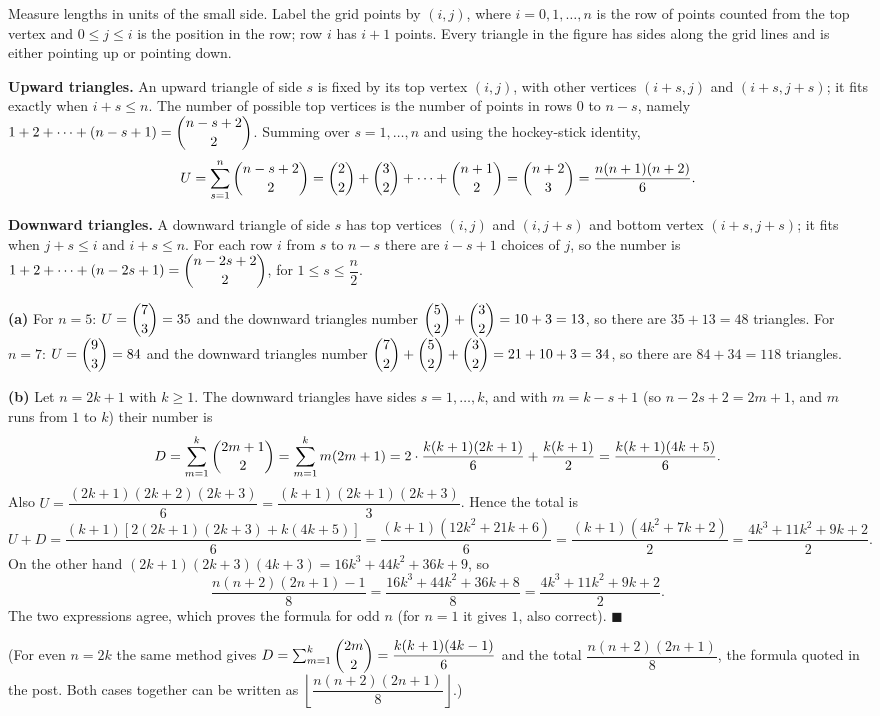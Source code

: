 Measure lengths in units of the small side. Label the grid points by $(i,j)$, where $i=0,1,\dots,n$ is the row of points counted from the top vertex and $0\le j\le i$ is the position in the row; row $i$ has $i+1$ points. Every triangle in the figure has sides along the grid lines and is either pointing up or pointing down.

\textbf{Upward triangles.} An upward triangle of side $s$ is fixed by its top vertex $(i,j)$, with other vertices $(i+s,j)$ and $(i+s,j+s)$; it fits exactly when $i+s\le n$. The number of possible top vertices is the number of points in rows $0$ to $n-s$, namely $1+2+\cdots+(n-s+1)=\dbinom{n-s+2}{2}$. Summing over $s=1,\dots,n$ and using the hockey-stick identity,
\[
U=\sum_{s=1}^{n}\dbinom{n-s+2}{2}=\dbinom22+\dbinom32+\cdots+\dbinom{n+1}{2}=\dbinom{n+2}{3}=\dfrac{n(n+1)(n+2)}{6}.
\]

\textbf{Downward triangles.} A downward triangle of side $s$ has top vertices $(i,j)$ and $(i,j+s)$ and bottom vertex $(i+s,j+s)$; it fits when $j+s\le i$ and $i+s\le n$. For each row $i$ from $s$ to $n-s$ there are $i-s+1$ choices of $j$, so the number is $1+2+\cdots+(n-2s+1)=\dbinom{n-2s+2}{2}$, for $1\le s\le\dfrac {n}{2}$.

\textbf{(a)} For $n=5$: $U=\dbinom73=35$ and the downward triangles number $\dbinom52+\dbinom32=10+3=13$, so there are $35+13=\boxed{48}$ triangles. For $n=7$: $U=\dbinom93=84$ and the downward triangles number $\dbinom72+\dbinom52+\dbinom32=21+10+3=34$, so there are $84+34=\boxed{118}$ triangles.

\textbf{(b)} Let $n=2k+1$ with $k\ge1$. The downward triangles have sides $s=1,\dots,k$, and with $m=k-s+1$ (so $n-2s+2=2m+1$, and $m$ runs from $1$ to $k$) their number is
\[
D=\sum_{m=1}^{k}\dbinom{2m+1}{2}=\sum_{m=1}^{k}m(2m+1)=2\cdot\dfrac{k(k+1)(2k+1)}{6}+\dfrac{k(k+1)}{2}=\dfrac{k(k+1)(4k+5)}{6}.
\]
Also $U=\dfrac{(2k+1)(2k+2)(2k+3)}{6}=\dfrac{(k+1)(2k+1)(2k+3)}{3}$. Hence the total is
\[
U+D=\dfrac{(k+1)\left[2(2k+1)(2k+3)+k(4k+5)\right]}{6}=\dfrac{(k+1)(12k^2+21k+6)}{6}=\dfrac{(k+1)(4k^2+7k+2)}{2}=\dfrac{4k^3+11k^2+9k+2}{2}.
\]
On the other hand $(2k+1)(2k+3)(4k+3)=16k^3+44k^2+36k+9$, so
\[
\dfrac{n(n+2)(2n+1)-1}{8}=\dfrac{16k^3+44k^2+36k+8}{8}=\dfrac{4k^3+11k^2+9k+2}{2}.
\]
The two expressions agree, which proves the formula for odd $n$ (for $n=1$ it gives $1$, also correct). $\blacksquare$

(For even $n=2k$ the same method gives $D=\sum_{m=1}^{k}\dbinom{2m}{2}=\dfrac{k(k+1)(4k-1)}{6}$ and the total $\dfrac{n(n+2)(2n+1)}{8}$, the formula quoted in the post. Both cases together can be written as $\left\lfloor\dfrac{n(n+2)(2n+1)}{8}\right\rfloor$.)
